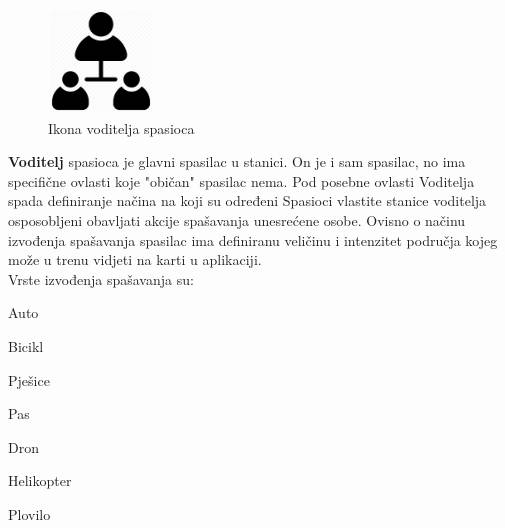 {			
			\begin{figure}
				\centering
				\includegraphics[width=0.25\textwidth]{./slike/leader.png}
				\caption{Ikona voditelja spasioca}
			\end{figure}
			\textbf{Voditelj} spasioca je glavni spasilac u stanici. On je i sam spasilac, no ima specifične ovlasti koje "običan" spasilac nema. Pod posebne ovlasti Voditelja spada definiranje načina na koji su određeni Spasioci vlastite stanice voditelja osposobljeni obavljati akcije spašavanja unesrećene osobe. Ovisno o načinu izvođenja spašavanja spasilac ima definiranu veličinu i intenzitet područja kojeg može u trenu vidjeti na karti u aplikaciji.\\
			Vrste izvođenja spašavanja su:
			
			\begin{packed_item}
				\item {Auto} 
				\item {Bicikl}
				\item {Pješice}
				\item {Pas}
				\item {Dron}
				\item {Helikopter}
				\item {Plovilo}
			\end{packed_item}
		
}

